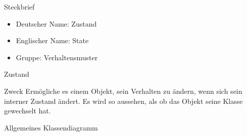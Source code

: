\begin{frame}{Steckbrief}
	\begin{itemize}
 		\item Deutscher Name: Zustand
 		\item Englischer Name: State
 		\item Gruppe: Verhaltensmuster
 	\end{itemize}
\end{frame}

\begin{frame}{Zustand}
	\begin{block}{Zweck}
 		Ermögliche es einem Objekt, sein Verhalten zu ändern, wenn sich sein interner Zustand ändert. Es wird so aussehen, als ob das Objekt seine Klasse gewechselt hat. 
 	\end{block}
\end{frame}

\begin{frame}{Allgemeines Klassendiagramm}
\end{frame}



